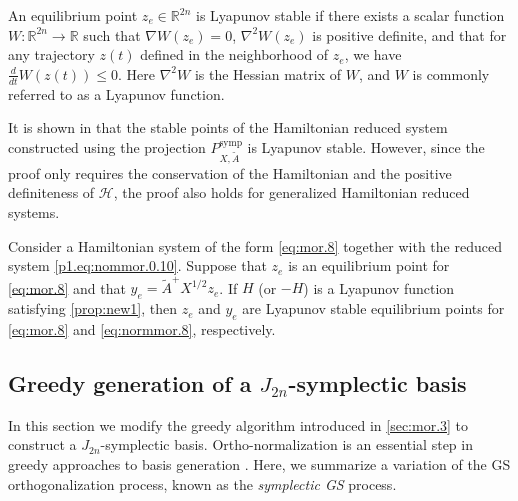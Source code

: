 \begin{proposition} \label{prop:new1}
\cite{bhatia2002stability} An equilibrium point $z_e\in \mathbb R^{2n}$ is Lyapunov stable if there exists a scalar function $W:\mathbb R^{2n} \to \mathbb R$ such that $\nabla W(z_e) = 0$, $\nabla^2 W(z_e)$ is positive definite, and that for any trajectory $z(t)$ defined in the neighborhood of $z_e$, we have $\frac{d}{dt} W(z(t))\leq 0$. Here $\nabla^2 W$ is the Hessian matrix of $W$, and $W$ is commonly referred to as a Lyapunov function.
\end{proposition}

It is shown in \cite{doi:10.1137/17M1111991} that the stable points of the Hamiltonian reduced system constructed using the projection $P^{\text{symp}}_{X,\tilde A}$ is Lyapunov stable. However, since the proof only requires the conservation of the Hamiltonian and the positive definiteness of $\mathcal H$, the proof also holds for generalized Hamiltonian reduced systems.

\begin{theorem}
\cite{doi:10.1137/17M1111991} Consider a Hamiltonian system of the form \cref{eq:mor.8} together with the reduced system \cref{p1.eq:nommor.0.10}. Suppose that $z_e$ is an equilibrium point for \cref{eq:mor.8} and that $y_e = \tilde A ^+ X^{1/2} z_e$. If $H$ (or $-H$) is a Lyapunov function satisfying \cref{prop:new1}, then $z_e$ and $y_e$ are Lyapunov stable equilibrium points for \cref{eq:mor.8} and \cref{eq:normmor.8}, respectively.
\end{theorem}

\subsection{Greedy generation of a $J_{2n}$-symplectic basis} \label{sec:normmor.2}
In this section we modify the greedy algorithm introduced in \cref{sec:mor.3} to construct a $J_{2n}$-symplectic basis. Ortho-normalization is an essential step in greedy approaches to basis generation \cite{hesthaven2015certified,quarteroni2015reduced}. Here, we summarize a variation of the GS orthogonalization process, known as the \emph{symplectic GS} process.


